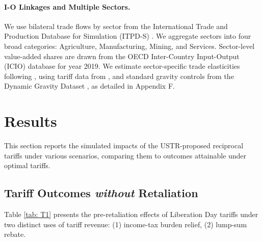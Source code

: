 \documentclass[12pt]{article}
\begin{document}
\paragraph{I-O Linkages and Multiple Sectors.}
We use bilateral trade flows by sector from the International Trade and Production Database for Simulation (ITPD-S) \citep{borchert2024globalization}. We aggregate sectors into four broad categories: Agriculture, Manufacturing, Mining, and Services. Sector-level value-added shares are drawn from the OECD Inter-Country Input-Output (ICIO) database for year 2019. We estimate sector-specific trade elasticities following \citet{fontagne2022tariff}, using tariff data from \citet{teti2024missing}, and standard gravity controls from the Dynamic Gravity Dataset \citep{gurevich2018dynamic}, as detailed in Appendix F.

\section{Results}
\label{sec:results}

This section reports the simulated impacts of the USTR-proposed reciprocal tariffs under various scenarios, comparing them to outcomes attainable under optimal tariffs. 

\subsection{Tariff Outcomes \textit{without} Retaliation}

Table \ref{tab: T1} presents the pre-retaliation effects of Liberation Day tariffs under two distinct uses of tariff revenue: (1) income-tax burden relief, (2) lump-sum rebate.


\end{document}
